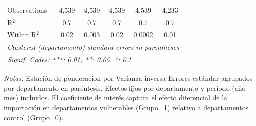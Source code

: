 \documentclass[12pt]{article}
\begin{document}
\begin{table}[htbp]
\begin{threeparttable}
\begin{tabular}{lccccc}
      Observations                                      & 4,539                & 4,539               & 4,539               & 4,539           & 4,233\\  
      R$^2$                                             & 0.7                  & 0.7                 & 0.7                 & 0.7             & 0.7\\  
      Within R$^2$                                      & 0.02                 & 0.003               & 0.02                & 0.0002          & 0.01\\  
      \midrule \midrule
      \multicolumn{6}{l}{\emph{Clustered (departamento) standard-errors in parentheses}}\\
      \multicolumn{6}{l}{\emph{Signif. Codes: ***: 0.01, **: 0.05, *: 0.1}}\\
   \end{tabular}


\begin{tablenotes}
\footnotesize
\item \textit{Notas:} Estación de ponderacion por Varianza inversa
Errores estándar agrupados por departamento en paréntesis.
Efectos fijos por departamento y período (año-mes) incluidos.
El coeficiente de interés captura el efecto diferencial de la importación
en departamentos vulnerables (Grupo=1) relativo a departamentos control (Grupo=0).
\end{tablenotes}
\end{threeparttable}
\end{table}
\end{document}
